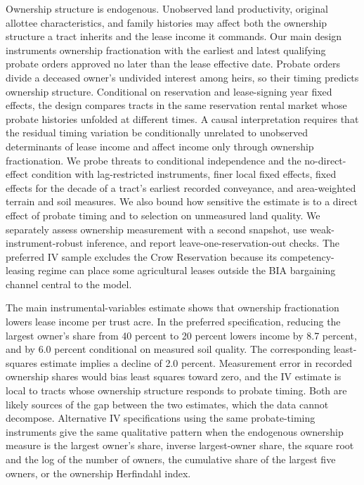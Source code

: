 \documentclass[12pt]{article}
\begin{document}
Ownership structure is endogenous. Unobserved land productivity, original allottee characteristics, and family histories may affect both the ownership structure a tract inherits and the lease income it commands. Our main design instruments ownership fractionation with the earliest and latest qualifying probate orders approved no later than the lease effective date. Probate orders divide a deceased owner's undivided interest among heirs, so their timing predicts ownership structure. Conditional on reservation and lease-signing year fixed effects, the design compares tracts in the same reservation rental market whose probate histories unfolded at different times. A causal interpretation requires that the residual timing variation be conditionally unrelated to unobserved determinants of lease income and affect income only through ownership fractionation. We probe threats to conditional independence and the no-direct-effect condition with lag-restricted instruments, finer local fixed effects, fixed effects for the decade of a tract's earliest recorded conveyance, and area-weighted terrain and soil measures. We also bound how sensitive the estimate is to a direct effect of probate timing and to selection on unmeasured land quality. We separately assess ownership measurement with a second snapshot, use weak-instrument-robust inference, and report leave-one-reservation-out checks. The preferred IV sample excludes the Crow Reservation because its competency-leasing regime can place some agricultural leases outside the BIA bargaining channel central to the model.

The main instrumental-variables estimate shows that ownership fractionation lowers lease income per trust acre. In the preferred specification, reducing the largest owner's share from 40 percent to 20 percent lowers income by 8.7 percent, and by 6.0 percent conditional on measured soil quality. The corresponding least-squares estimate implies a decline of 2.0 percent. Measurement error in recorded ownership shares would bias least squares toward zero, and the IV estimate is local to tracts whose ownership structure responds to probate timing. Both are likely sources of the gap between the two estimates, which the data cannot decompose. Alternative IV specifications using the same probate-timing instruments give the same qualitative pattern when the endogenous ownership measure is the largest owner's share, inverse largest-owner share, the square root and the log of the number of owners, the cumulative share of the largest five owners, or the ownership Herfindahl index.
\end{document}
